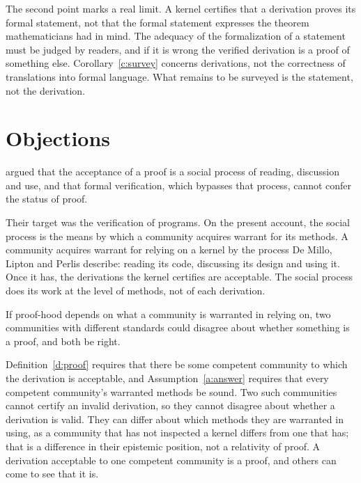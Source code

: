 \documentclass{situationist-preprint}
\begin{document}
The second point marks a real limit. A kernel certifies that a derivation proves its formal statement, not that the formal statement expresses the theorem mathematicians had in mind. The adequacy of the formalization of a statement must be judged by readers, and if it is wrong the verified derivation is a proof of something else. Corollary~\ref{c:survey} concerns derivations, not the correctness of translations into formal language. What remains to be surveyed is the statement, not the derivation.

\section{Objections}

\begin{objection}
\citet{DeMilloEtAl1979} argued that the acceptance of a proof is a social process of reading, discussion and use, and that formal verification, which bypasses that process, cannot confer the status of proof.
\end{objection}

\begin{reply}
Their target was the verification of programs. On the present account, the social process is the means by which a community acquires warrant for its methods. A community acquires warrant for relying on a kernel by the process De Millo, Lipton and Perlis describe: reading its code, discussing its design and using it. Once it has, the derivations the kernel certifies are acceptable. The social process does its work at the level of methods, not of each derivation.
\end{reply}

\begin{objection}[Relativism]
If proof-hood depends on what a community is warranted in relying on, two communities with different standards could disagree about whether something is a proof, and both be right.
\end{objection}

\begin{reply}
Definition~\ref{d:proof} requires that there be some competent community to which the derivation is acceptable, and Assumption~\ref{a:answer} requires that every competent community's warranted methods be sound. Two such communities cannot certify an invalid derivation, so they cannot disagree about whether a derivation is valid. They can differ about which methods they are warranted in using, as a community that has not inspected a kernel differs from one that has; that is a difference in their epistemic position, not a relativity of proof. A derivation acceptable to one competent community is a proof, and others can come to see that it is.
\end{reply}
\end{document}
